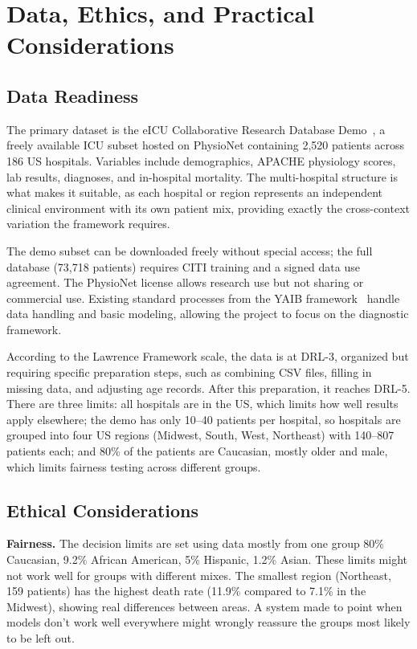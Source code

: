 \section{Data, Ethics, and Practical Considerations}

\subsection{Data Readiness}

The primary dataset is the eICU Collaborative Research Database Demo~\cite{pollard2018eicu}, a freely available ICU subset hosted on PhysioNet containing 2,520 patients across 186 US hospitals. Variables include demographics, APACHE physiology scores, lab results, diagnoses, and in-hospital mortality. The multi-hospital structure is what makes it suitable, as each hospital or region represents an independent clinical environment with its own patient mix, providing exactly the cross-context variation the framework requires.

The demo subset can be downloaded freely without special access; the full database (73,718 patients) requires CITI training and a signed data use agreement. The PhysioNet license allows research use but not sharing or commercial use. Existing standard processes from the YAIB framework~\cite{yeche2023yaib} handle data handling and basic modeling, allowing the project to focus on the diagnostic framework.

According to the Lawrence Framework scale, the data is at DRL-3, organized but requiring specific preparation steps, such as combining CSV files, filling in missing data, and adjusting age records. After this preparation, it reaches DRL-5. There are three limits: all hospitals are in the US, which limits how well results apply elsewhere; the demo has only 10--40 patients per hospital, so hospitals are grouped into four US regions (Midwest, South, West, Northeast) with 140--807 patients each; and 80\% of the patients are Caucasian, mostly older and male, which limits fairness testing across different groups.

\subsection{Ethical Considerations}

\textbf{Fairness.} The decision limits are set using data mostly from one group 80\% Caucasian, 9.2\% African American, 5\% Hispanic, 1.2\% Asian. These limits might not work well for groups with different mixes. The smallest region (Northeast, 159 patients) has the highest death rate (11.9\% compared to 7.1\% in the Midwest), showing real differences between areas. A system made to point when models don't work well everywhere might wrongly reassure the groups most likely to be left out.

